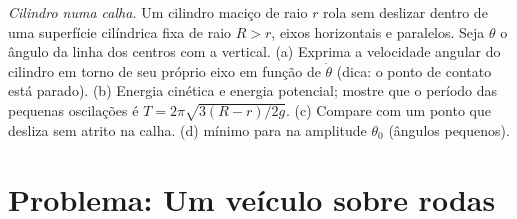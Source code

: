 \begin{exercise}[$\star\star\star$]\label{exo:b2:rigid-body-mechanics:12}
\emph{Cilindro numa calha.} Um cilindro maciço de raio $r$ rola sem
deslizar dentro de uma superfície cilíndrica fixa de raio $R > r$, eixos
horizontais e paralelos. Seja $\theta$ o ângulo da linha dos
centros com a vertical. (a) Exprima a velocidade angular do
cilindro em torno de seu próprio eixo em função de $\dot\theta$ (dica: o ponto de
contato está parado). (b) Energia cinética e energia potencial; mostre que o
período das pequenas oscilações é $T = 2\pi\sqrt{3(R - r)/2g}$. (c) Compare
com um ponto que desliza sem atrito na calha. (d) 
mínimo para  na amplitude $\theta_0$
(ângulos pequenos).
\end{exercise}

\section{Problema: Um veículo sobre rodas}

